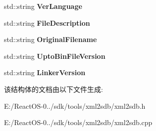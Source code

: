 \begin{DoxyCompactItemize}
std\+::string {\bfseries Ver\+Language}
\item 
\mbox{\label{struct_matching_file_a53f62bf3b1cce8977d5b154ce9edfecf}} 
std\+::string {\bfseries File\+Description}
\item 
\mbox{\label{struct_matching_file_a1e5da16fbbc9672506d5a0db1b741220}} 
std\+::string {\bfseries Original\+Filename}
\item 
\mbox{\label{struct_matching_file_aada179ba6fe6e025abf1306ba98b0eb1}} 
std\+::string {\bfseries Upto\+Bin\+File\+Version}
\item 
\mbox{\label{struct_matching_file_a3dba35e719fc6385170882a04849359c}} 
std\+::string {\bfseries Linker\+Version}
\end{DoxyCompactItemize}


该结构体的文档由以下文件生成\+:\begin{DoxyCompactItemize}
\item 
E\+:/\+React\+O\+S-\/0../sdk/tools/xml2sdb/xml2sdb.\+h\item 
E\+:/\+React\+O\+S-\/0../sdk/tools/xml2sdb/xml2sdb.\+cpp\end{DoxyCompactItemize}
